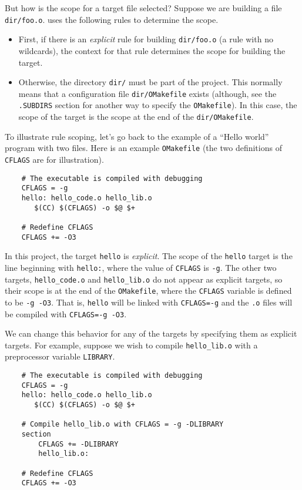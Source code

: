 But how is the scope for a target file selected?  Suppose we are building a file \verb+dir/foo.o+.
 uses the following rules to determine the scope.

\begin{itemize}
\item First, if there is an \emph{explicit} rule for building \verb+dir/foo.o+ (a rule with no
wildcards), the context for that rule determines the scope for building the target.
\item Otherwise, the directory \verb+dir/+ must be part of the project.  This normally means that a
configuration file \verb+dir/OMakefile+ exists (although, see the \verb+.SUBDIRS+ section for
another way to specify the \verb+OMakefile+).  In this case, the scope of the target is the scope at
the end of the \verb+dir/OMakefile+.
\end{itemize}

To illustrate rule scoping, let's go back to the example of a ``Hello world'' program with two
files.  Here is an example \verb+OMakefile+ (the two definitions of \verb+CFLAGS+ are for
illustration).

\begin{verbatim}
    # The executable is compiled with debugging
    CFLAGS = -g
    hello: hello_code.o hello_lib.o
       $(CC) $(CFLAGS) -o $@ $+

    # Redefine CFLAGS
    CFLAGS += -O3
\end{verbatim}

In this project, the target \verb+hello+ is \emph{explicit}.  The scope of the \verb+hello+ target
is the line beginning with \verb+hello:+, where the value of \verb+CFLAGS+ is \verb+-g+.  The other
two targets, \verb+hello_code.o+ and \verb+hello_lib.o+ do not appear as explicit targets, so their
scope is at the end of the \verb+OMakefile+, where the \verb+CFLAGS+ variable is defined to be
\verb+-g -O3+.  That is, \verb+hello+ will be linked with \verb+CFLAGS=-g+ and the \verb+.o+ files
will be compiled with \verb+CFLAGS=-g -O3+.

We can change this behavior for any of the targets by specifying them as explicit targets.  For
example, suppose we wish to compile \verb+hello_lib.o+ with a preprocessor variable \verb+LIBRARY+.

\begin{verbatim}
    # The executable is compiled with debugging
    CFLAGS = -g
    hello: hello_code.o hello_lib.o
       $(CC) $(CFLAGS) -o $@ $+

    # Compile hello_lib.o with CFLAGS = -g -DLIBRARY
    section
        CFLAGS += -DLIBRARY
        hello_lib.o:

    # Redefine CFLAGS
    CFLAGS += -O3
\end{verbatim}


